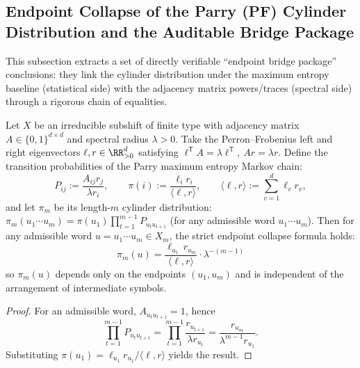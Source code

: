 \subsection{Endpoint Collapse of the Parry (PF) Cylinder Distribution and the Auditable Bridge Package}\label{subsec:parry-endpoint-bridge}

This subsection extracts a set of directly verifiable ``endpoint bridge package'' conclusions: they link the cylinder distribution under the maximum entropy baseline (statistical side) with the adjacency matrix powers/traces (spectral side) through a rigorous chain of equalities.

\begin{theorem}\label{thm:parry-endpoint-collapse}
Let \(X\) be an irreducible subshift of finite type with adjacency matrix \(A\in\{0,1\}^{d\times d}\) and spectral radius \(\lambda>0\).
Take the Perron--Frobenius left and right eigenvectors \(\ell,r\in\RR_{>0}^d\) satisfying
\(
\ell^{\mathsf T}A=\lambda \ell^{\mathsf T},\ Ar=\lambda r
\).
Define the transition probabilities of the Parry maximum entropy Markov chain:
\[
P_{ij}:=\frac{A_{ij}r_j}{\lambda r_i},
\qquad
\pi(i):=\frac{\ell_i r_i}{\langle \ell,r\rangle},
\qquad
\langle \ell,r\rangle:=\sum_{v=1}^d \ell_v r_v,
\]
and let \(\pi_m\) be its length-\(m\) cylinder distribution:
\(
\pi_m(u_1\cdots u_m)=\pi(u_1)\prod_{t=1}^{m-1}P_{u_tu_{t+1}}
\) (for any admissible word \(u_1\cdots u_m\)).
Then for any admissible word \(u=u_1\cdots u_m\in X_m\), the strict endpoint collapse formula holds:
\[
\boxed{\;
\pi_m(u)=\frac{\ell_{u_1}\,r_{u_m}}{\langle \ell,r\rangle}\cdot \lambda^{-(m-1)}\;}
\]
so \(\pi_m(u)\) depends only on the endpoints \((u_1,u_m)\) and is independent of the arrangement of intermediate symbols.
\end{theorem}
\begin{proof}
For an admissible word, \(A_{u_tu_{t+1}}=1\), hence
\[
\prod_{t=1}^{m-1}P_{u_tu_{t+1}}
=
\prod_{t=1}^{m-1}\frac{r_{u_{t+1}}}{\lambda r_{u_t}}
=\frac{r_{u_m}}{\lambda^{m-1}r_{u_1}}.
\]
Substituting \(\pi(u_1)=\ell_{u_1}r_{u_1}/\langle \ell,r\rangle\) yields the result.
\end{proof}

